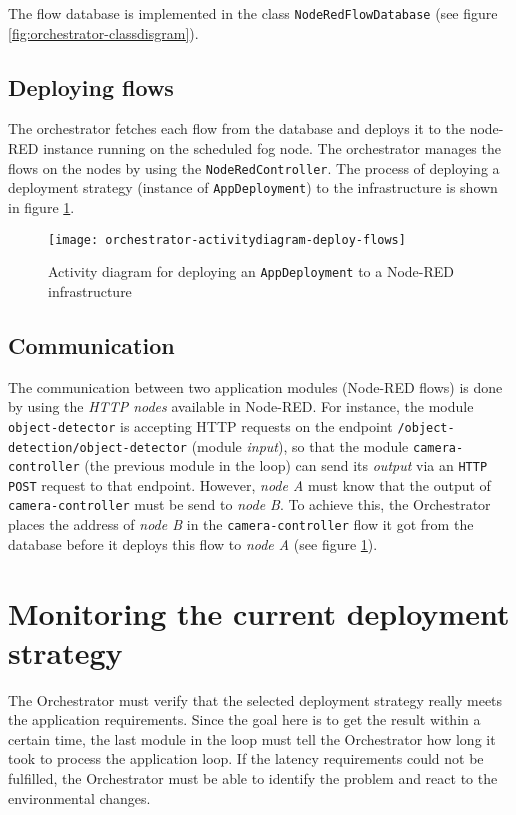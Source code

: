 The flow database is implemented in the class \texttt{NodeRedFlowDatabase} (see figure \ref{fig:orchestrator-classdisgram}).

\subsection*{Deploying flows}
The orchestrator fetches each flow from the database and deploys it to the node-RED instance running on the scheduled fog node. The orchestrator manages the flows on the nodes by using the \texttt{NodeRedController}. The process of deploying a deployment strategy (instance of \texttt{AppDeployment}) to the infrastructure is shown in figure \ref{fig:orchestrator-activitydiagram-deploy-flows}.

\begin{figure}[htb]
    \centering
    \texttt{[image: orchestrator-activitydiagram-deploy-flows]}
    \caption{Activity diagram for deploying an \texttt{AppDeployment} to a Node-RED infrastructure}
    \label{fig:orchestrator-activitydiagram-deploy-flows}
\end{figure}

\subsection*{Communication}
The communication between two application modules (Node-RED flows) is done by using the \textit{HTTP nodes} available in Node-RED. For instance, the module \texttt{object-detector} is accepting HTTP requests on the endpoint \texttt{/object-detection/object-detector} (module \textit{input}), so that the module \texttt{camera-controller} (the previous module in the loop) can send its \textit{output} via an \texttt{HTTP POST} request to that endpoint. However, \textit{node A} must know that the output of \texttt{camera-controller} must be send to \textit{node B}. To achieve this, the Orchestrator places the address of \textit{node B} in the \texttt{camera-controller} flow it got from the database before it deploys this flow to \textit{node A} (see figure \ref{fig:orchestrator-activitydiagram-deploy-flows}).

\section{Monitoring the current deployment strategy\label{sec:orchestrator-monitoring-deployment-strategy}}

The Orchestrator must verify that the selected deployment strategy really meets the application requirements. Since the goal here is to get the result within a certain time, the last module in the loop must tell the Orchestrator how long it took to process the application loop. If the latency requirements could not be fulfilled, the Orchestrator must be able to identify the problem and react to the environmental changes.

